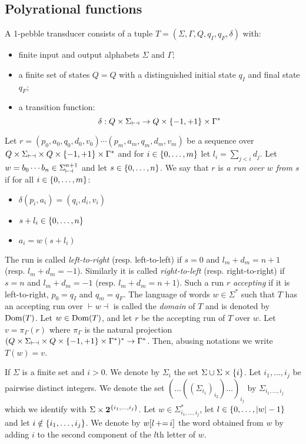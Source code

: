 \subsection{Polyrational functions}
\begin{definition}
A 1-pebble transducer consists of a tuple $T=(\Sigma,\Gamma,Q, q_I,q_F,\delta)$ with:
\begin{itemize}
\item finite input and output alphabets $\Sigma$ and $\Gamma$;
\item a finite set of states $Q=Q$ with a distinguished initial state $q_I$ and final state $q_F$;
\item a transition function:
$$ \delta: Q\times \Sigma_{\vdash \dashv} \to Q\times\{-1,+1\}\times\Gamma^*$$
\end{itemize}
\end{definition}

Let $r=(p_0,a_0,q_0,d_0,v_0)\cdots (p_m,a_m,q_m,d_m,v_m)$ be a sequence over $Q\times \Sigma_{\vdash \dashv}\times Q\times \{-1,+1\}\times \Gamma^*$ and for $i\in \{0,\ldots,m\}$ let  $l_i=\sum_{j< i }d_j$.
Let $w=b_0\cdots b_n\in \Sigma_{\vdash \dashv}^{n+1}$ and let $s\in \{0,\ldots, n\}$. We say that $r$ is \emph{a run over $w$ from $s$} if for all $i\in \{0,\ldots,m\}$:

\begin{itemize}
\item $\delta(p_i,a_i)=(q_i,d_i,v_i)$
\item $s+l_i\in \{0,\ldots, n\}$
\item $a_i=w(s+l_i)$
\end{itemize}

The run is called \emph{left-to-right} (resp. left-to-left) if $s=0$ and $l_m+d_m=n+1$ (resp. $l_m+d_m=-1$). Similarly it is called \emph{right-to-left} (resp. right-to-right) if $s=n$ and $l_m+d_m=-1$ (resp. $l_m+d_m=n+1$).
Such a run $r$ \emph{accepting} if it is left-to-right, $p_0=q_I$ and $q_m=q_F$.
The language of words $w\in \Sigma^*$ such that $T$ has an accepting run over $\vdash w\dashv$ is called the \emph{domain} of $T$ and is denoted by $\operatorname{\mathrm{Dom}}(T)$. Let $w\in \operatorname{\mathrm{Dom}}(T)$, and let $r$ be the accepting run of $T$ over $w$. Let $v=\pi_\Gamma(r)$ where $\pi_\Gamma$ is the natural projection $(Q\times \Sigma_{\vdash \dashv} \times Q\times \{-1,+1\}\times \Gamma^*)^* \rightarrow \Gamma^*$.
Then, abusing notations we write $T(w)=v$.

If $\Sigma$ is a finite set and $i>0$. We denote by $\Sigma_i$ the set $\Sigma\cup \Sigma\times {\{i\}}$.
Let $i_1,\ldots,i_j$ be pairwise distinct integers. We denote the set $(\ldots((\Sigma_{i_1})_{i_2})\ldots)_{i_j}$ by $\Sigma_{i_1,\ldots,i_j}$ which we identify with $\Sigma\times \mathbf 2^{\{i_1,\ldots,i_j\}}$.
Let $w\in \Sigma_{i_1,\ldots,i_j}^*$, let $l\in \{0,\ldots,|w|-1\}$ and let $i\notin \{i_1,\ldots,i_j\}$.
We denote by $w[l\mathop{{+}{=}} i]$ the word obtained from $w$ by adding $i$ to the second component of the $l$th letter of $w$.

